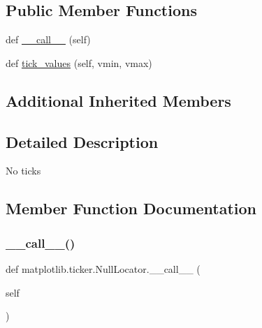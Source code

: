 \subsection*{Public Member Functions}
\begin{DoxyCompactItemize}
\item 
def \hyperlink{classmatplotlib_1_1ticker_1_1NullLocator_a2287e65c4fc679d4f8727e3cc16e60bd}{\+\_\+\+\_\+call\+\_\+\+\_\+} (self)
\item 
def \hyperlink{classmatplotlib_1_1ticker_1_1NullLocator_a4b7af40d2b494afabb98f14c88e2176d}{tick\+\_\+values} (self, vmin, vmax)
\end{DoxyCompactItemize}
\subsection*{Additional Inherited Members}


\subsection{Detailed Description}
\begin{DoxyVerb}No ticks
\end{DoxyVerb}
 

\subsection{Member Function Documentation}
\mbox{\label{classmatplotlib_1_1ticker_1_1NullLocator_a2287e65c4fc679d4f8727e3cc16e60bd}} 
\subsubsection{\texorpdfstring{\+\_\+\+\_\+call\+\_\+\+\_\+()}{\_\_call\_\_()}}
{\footnotesize\ttfamily def matplotlib.\+ticker.\+Null\+Locator.\+\_\+\+\_\+call\+\_\+\+\_\+ (\begin{DoxyParamCaption}\item[{}]{self }\end{DoxyParamCaption})}

\mbox{\label{classmatplotlib_1_1ticker_1_1NullLocator_a4b7af40d2b494afabb98f14c88e2176d}} 
